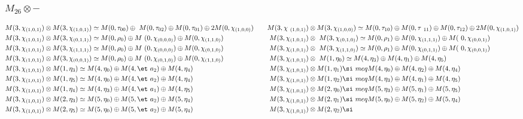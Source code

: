 \subsubsection{$M_26\otimes -$}
\begin{align*}
M(3,\chi_{(1,0,1)}) &\otimes M(3,\chi_{(1,0,1)}) \simeq M(0,\tau_{00}) \oplus \
M(0,\tau_{02}) \oplus M(0,\tau_{01}) \oplus 2 M(0,\chi_{(1,0,0)}) &&& M(3,\chi\
_{(1,0,1)}) &\otimes M(3,\chi_{(1,0,0)}) \simeq M(0,\tau_{10}) \oplus M(0,\tau\
_{11}) \oplus M(0,\tau_{12}) \oplus 2 M(0,\chi_{(1,0,1)})\\
M(3,\chi_{(1,0,1)}) &\otimes M(3,\chi_{(0,1,1)}) \simeq M(0,\rho_{0}) \oplus M\
(0,\chi_{(0,0,0)}) \oplus M(0,\chi_{(1,1,0)}) &&& M(3,\chi_{(1,0,1)}) &\otimes\
 M(3,\chi_{(0,1,0)}) \simeq M(0,\rho_{1}) \oplus M(0,\chi_{(1,1,1)}) \oplus M(\
0,\chi_{(0,0,1)})\\
M(3,\chi_{(1,0,1)}) &\otimes M(3,\chi_{(1,1,1)}) \simeq M(0,\rho_{0}) \oplus M\
(0,\chi_{(0,0,0)}) \oplus M(0,\chi_{(0,1,0)}) &&& M(3,\chi_{(1,0,1)}) &\otimes\
 M(3,\chi_{(1,1,0)}) \simeq M(0,\rho_{1}) \oplus M(0,\chi_{(0,1,1)}) \oplus M(\
0,\chi_{(0,0,1)})\\
M(3,\chi_{(1,0,1)}) &\otimes M(3,\chi_{(0,0,1)}) \simeq M(0,\rho_{0}) \oplus M\
(0,\chi_{(0,1,0)}) \oplus M(0,\chi_{(1,1,0)}) &&& M(3,\chi_{(1,0,1)}) &\otimes\
 M(1,\eta_{0}) \simeq M(4,\eta_{3}) \oplus M(4,\eta_{1}) \oplus M(4,\eta_{5})\
\\
M(3,\chi_{(1,0,1)}) &\otimes M(1,\eta_{3}) \simeq M(4,\eta_{0}) \oplus M(4,\et\
a_{2}) \oplus M(4,\eta_{4}) &&& M(3,\chi_{(1,0,1)}) &\otimes M(1,\eta_{1}) \si\
meq M(4,\eta_{0}) \oplus M(4,\eta_{2}) \oplus M(4,\eta_{4})\\
M(3,\chi_{(1,0,1)}) &\otimes M(1,\eta_{5}) \simeq M(4,\eta_{0}) \oplus M(4,\et\
a_{2}) \oplus M(4,\eta_{4}) &&& M(3,\chi_{(1,0,1)}) &\otimes M(1,\eta_{2}) \si\
meq M(4,\eta_{3}) \oplus M(4,\eta_{1}) \oplus M(4,\eta_{5})\\
M(3,\chi_{(1,0,1)}) &\otimes M(1,\eta_{4}) \simeq M(4,\eta_{3}) \oplus M(4,\et\
a_{1}) \oplus M(4,\eta_{5}) &&& M(3,\chi_{(1,0,1)}) &\otimes M(2,\eta_{0}) \si\
meq M(5,\eta_{3}) \oplus M(5,\eta_{1}) \oplus M(5,\eta_{5})\\
M(3,\chi_{(1,0,1)}) &\otimes M(2,\eta_{3}) \simeq M(5,\eta_{0}) \oplus M(5,\et\
a_{2}) \oplus M(5,\eta_{4}) &&& M(3,\chi_{(1,0,1)}) &\otimes M(2,\eta_{1}) \si\
meq M(5,\eta_{0}) \oplus M(5,\eta_{2}) \oplus M(5,\eta_{4})\\
M(3,\chi_{(1,0,1)}) &\otimes M(2,\eta_{5}) \simeq M(5,\eta_{0}) \oplus M(5,\et\
a_{2}) \oplus M(5,\eta_{4}) &&& M(3,\chi_{(1,0,1)}) &\otimes M(2,\eta_{2}) \si\

\end{align*}
